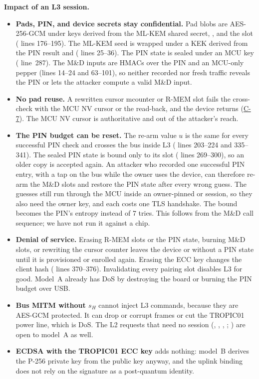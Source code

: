 \documentclass[11pt,a4paper]{article}
\begin{document}
\textbf{Impact of an L3 session.}
\begin{itemize}
\item \textbf{Pads, PIN, and device secrets stay confidential.} Pad blobs are AES-256-GCM under keys derived from the ML-KEM shared secret, , and the slot ( lines 176--195). The ML-KEM seed is wrapped under a KEK derived from the PIN result and  ( lines 25--36). The PIN state is sealed under an MCU key ( line~287). The M\&D inputs are HMACs over the PIN and an MCU-only pepper (lines 14--24 and 63--101), so neither recorded nor fresh traffic reveals the PIN or lets the attacker compute a valid M\&D input.
\item \textbf{No pad reuse.} A rewritten cursor mcounter or R-MEM slot fails the cross-check with the MCU NV cursor or the read-back, and the device returns  (\hyperref[c:C-7]{C-7}). The MCU NV cursor is authoritative and out of the attacker's reach.
\item \textbf{The PIN budget can be reset.} The re-arm value $u$ is the same for every successful PIN check and crosses the bus inside L3 ( lines 203--224 and 335--341). The sealed PIN state is bound only to its slot ( lines 269--300), so an older copy is accepted again. An attacker who recorded one successful PIN entry, with a tap on the bus while the owner uses the device, can therefore re-arm the M\&D slots and restore the PIN state after every wrong guess. The guesses still run through the MCU inside an owner-pinned  or  session, so they also need the owner key, and each costs one TLS handshake. The bound becomes the PIN's entropy instead of 7 tries. This follows from the M\&D call sequence; we have not run it against a chip.
\item \textbf{Denial of service.} Erasing R-MEM slots or the PIN state, burning M\&D slots, or rewriting the cursor counter leaves the device  or without a PIN state until it is provisioned or enrolled again. Erasing the ECC key changes the client hash ( lines 370--376). Invalidating every pairing slot disables L3 for good. Model~A already has DoS by destroying the board or burning the PIN budget over USB.
\item \textbf{Bus MITM without $s_H$} cannot inject L3 commands, because they are AES-GCM protected. It can drop or corrupt frames or cut the TROPIC01 power line, which is DoS. The L2 requests that need no session (, , , ; ) are open to model~A as well.
\item \textbf{ECDSA with the TROPIC01 ECC key} adds nothing: model~B derives the P-256 private key from the public key anyway, and the uplink binding does not rely on the signature as a post-quantum identity.
\end{itemize}
\end{document}
